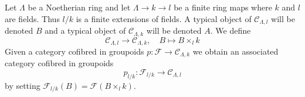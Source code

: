 \begin{situation}
\label{situation-change-of-fields}
Let $\Lambda$ be a Noetherian ring and let $\Lambda \to k \to l$ be a finite
ring maps where $k$ and $l$ are fields. Thus $l/k$ is a finite
extensions of fields. A typical object of $\mathcal{C}_{\Lambda, l}$ will be
denoted $B$ and a typical object of $\mathcal{C}_{\Lambda, k}$ will be
denoted $A$. We define
\begin{equation}
\label{equation-comparison}
\mathcal{C}_{\Lambda, l} \longrightarrow \mathcal{C}_{\Lambda, k},
\quad
B \longmapsto B \times_l k
\end{equation}
Given a category cofibred in groupoids
$p : \mathcal{F} \to \mathcal{C}_{\Lambda, k}$ we obtain
an associated category cofibred in groupoids
$$
p_{l/k} : \mathcal{F}_{l/k} \longrightarrow \mathcal{C}_{\Lambda, l}
$$
by setting $\mathcal{F}_{l/k}(B) = \mathcal{F}(B \times_l k)$.
\end{situation}